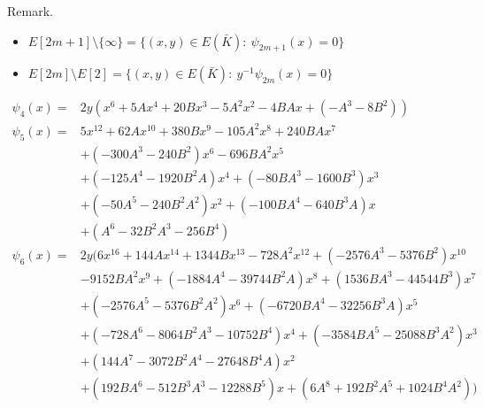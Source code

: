 \documentclass[10pt,handout]{beamer} %
\begin{document}
\begin{frame}
\begin{block}{Remark.}
\begin{itemize}
\item $E[2m+1]\setminus \{\infty\}= \{(x,y)\in E(\bar{K}):\  \psi_{2m+1}(x)=0\}$
\item $E[2m]\setminus E[2]= \{(x,y)\in E(\bar{K}):\  y^{-1}\psi_{2m}(x)=0\}$
\end{itemize}
\end{block}\vspace*{-2mm}\pause

\begin{example}\vspace*{-.7cm}
 \begin{scriptsize}
 \begin{align*}
\psi_4(x)=&2y(x^6
 + 5 A x^4
 + 20 B x^3
 - 5 A^2 x^2
 - 4 B A x
 + \left(-A^3
 - 8 B^2\right))\\
 \psi_5(x)=&5 x^{12}
 + 62 A x^{10}
 + 380 B x^9
 - 105 A^2 x^8
 + 240 B A x^7\\&
 + \left(-300 A^3
 - 240 B^2\right)  x^6
 - 696 B A^2 x^5\\&
 + \left(-125 A^4
 - 1920 B^2 A\right)  x^4
 + \left(-80 B A^3
 - 1600 B^3\right)  x^3\\&
 + \left(-50 A^5
 - 240 B^2 A^2\right)  x^2
 + \left(-100 B A^4
 - 640 B^3 A\right)  x\\&
 + \left(A^6
 - 32 B^2 A^3
 - 256 B^4\right)\\
 \psi_6(x)=&2y(
 6 x^{16}
 + 144 A x^{14}
 + 1344 B x^{13}
 - 728 A^2 x^{12}
 + \left(-2576 A^3
 - 5376 B^2\right)  x^{10}\\ &
 - 9152 B A^2 x^9
 + \left(-1884 A^4
 - 39744 B^2 A\right)  x^8
 + \left(1536 B A^3
 - 44544 B^3\right)  x^7\\&
 + \left(-2576 A^5
 - 5376 B^2 A^2\right)  x^6
 + \left(-6720 B A^4
 - 32256 B^3 A\right)  x^5\\&
 + \left(-728 A^6
 - 8064 B^2 A^3
 - 10752 B^4\right)  x^4
 + \left(-3584 B A^5
 - 25088 B^3 A^2\right)  x^3\\&
 + \left(144 A^7
 - 3072 B^2 A^4
 - 27648 B^4 A\right)  x^2\\&
 + \left(192 B A^6
 - 512 B^3 A^3
 - 12288 B^5\right)  x
 + \left(6 A^8
 + 192 B^2 A^5
 + 1024 B^4 A^2\right))
  \end{align*}
 \end{scriptsize}\vspace*{-7mm}
\end{example}

\end{frame}
\end{document}
